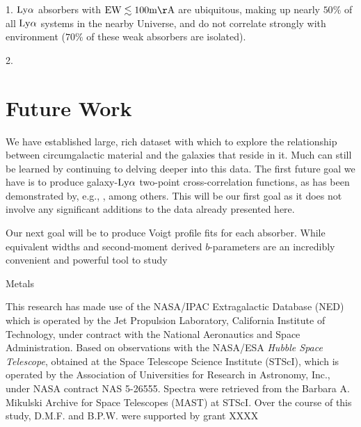 \documentclass[twocolumn,tighten]{aastex62}
\begin{document}
1. $\rm Ly\alpha$ absorbers with $\rm EW \lesssim 100 m\AA$ are ubiquitous, making up nearly $50\%$ of all $\rm Ly\alpha$ systems in the nearby Universe, and do not correlate strongly with environment ($70\%$ of these weak absorbers are isolated). 

2. 


\section{Future Work}

We have established large, rich dataset with which to explore the relationship between circumgalactic material and the galaxies that reside in it. Much can still be learned by continuing to delving deeper into this data. The first future goal we have is to produce galaxy-$\rm Ly\alpha$ two-point cross-correlation functions, as has been demonstrated by, e.g., \cite{chen2005}, among others. This will be our first goal as it does not involve any significant additions to the data already presented here.

Our next goal will be to produce Voigt profile fits for each absorber. While equivalent widths and second-moment derived $b$-parameters are an incredibly convenient and powerful tool to study

Metals





\acknowledgements

This research has made use of the NASA/IPAC Extragalactic Database (NED) which is operated by the Jet Propulsion Laboratory, California Institute of Technology, under contract with the National Aeronautics and Space Administration. Based on observations with the NASA/ESA \textit{Hubble Space Telescope}, obtained at the Space Telescope Science Institute (STScI), which is operated by the Association of Universities for Research in Astronomy, Inc., under NASA contract NAS 5-26555. Spectra were retrieved from the Barbara A. Mikulski Archive for Space Telescopes (MAST) at STScI. Over the course of this study, D.M.F. and B.P.W. were supported by grant XXXX


\clearpage

%
{}


\end{document}
